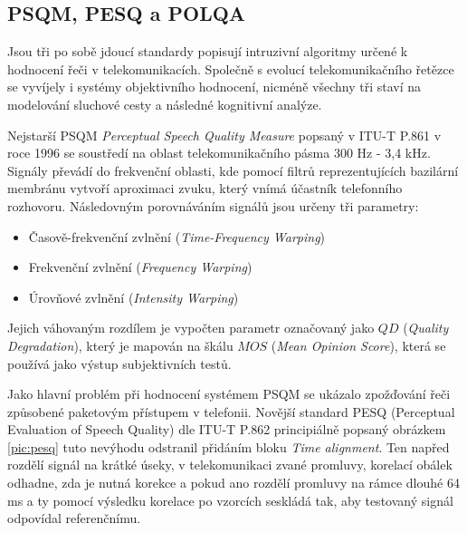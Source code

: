 \subsection{PSQM, PESQ a POLQA}    
    Jsou tři po sobě jdoucí standardy popisují intruzivní algoritmy určené k hodnocení řeči v telekomunikacích. Společně s evolucí telekomunikačního řetězce se vyvíjely i systémy objektivního hodnocení, nicméně všechny tři staví na modelování sluchové cesty a následné kognitivní analýze.
    
    Nejstarší PSQM \textit{Perceptual Speech Quality Measure} popsaný v ITU-T P.861 \cite{itut:861} v roce 1996 se soustředí na oblast telekomunikačního pásma 300 Hz - 3,4 kHz. Signály převádí do frekvenční oblasti, kde pomocí filtrů reprezentujících bazilární membránu vytvoří aproximaci zvuku, který vnímá účastník telefonního rozhovoru. Následovným porovnáváním signálů jsou určeny tři parametry:
    \begin{itemize}
        \item Časově-frekvenční zvlnění (\textit{Time-Frequency Warping})
        \item Frekvenční zvlnění (\textit{Frequency Warping})
        \item Úrovňové zvlnění (\textit{Intensity Warping})
    \end{itemize}
    Jejich váhovaným rozdílem je vypočten parametr označovaný jako $QD$ (\textit{Quality Degradation}), který je mapován na škálu $MOS$ (\textit{Mean Opinion Score}), která se používá jako výstup subjektivních testů.
    
    
    Jako hlavní problém při hodnocení systémem PSQM se ukázalo zpožďování řeči způsobené paketovým přístupem v telefonii. Novější standard PESQ (Perceptual Evaluation of Speech Quality) dle ITU-T P.862 \cite{itut:862} principiálně popsaný obrázkem \ref{pic:pesq} tuto nevýhodu odstranil přidáním bloku \textit{Time alignment}. Ten napřed rozdělí signál na krátké úseky, v telekomunikaci zvané promluvy, korelací obálek odhadne, zda je nutná korekce a pokud ano rozdělí promluvy na rámce dlouhé 64 ms a ty pomocí výsledku korelace po vzorcích seskládá tak, aby testovaný signál odpovídal referenčnímu.
    
